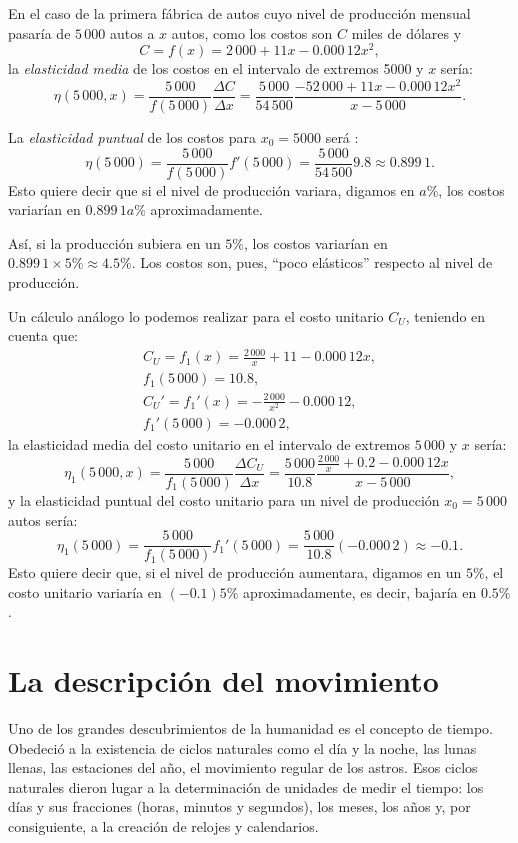 \begin{exemplo}[]{}
En el caso de la primera fábrica de autos cuyo nivel de producción mensual pasaría de $5\,000$
autos a $x$ autos, como los costos son $C$ miles de dólares y
\[
C = f(x)= 2\,000+11x-0.000\,12x^2,
\]
la \emph{elasticidad media} de los costos en el intervalo de extremos 5000 y $x$ sería:
\[
\eta (5\,000,x)= \frac{5\,000}{f(5\,000)}\frac{\Delta C}{\Delta x}=
\frac{5\,000}{54\,500}\frac{-52\,000+11x-0.000\,12x^2}{x-5\,000}.
\]

La \emph{elasticidad puntual} de los costos para $x_0 =5000$ será :
\[
\eta (5\,000)= \frac{5\,000}{f(5\,000)}f'(5\,000)= \frac{5\,000}{54\,500}9.8\approx 0.899\,1.
\]
Esto quiere decir que si el nivel de producción variara, digamos en $a\%$, los costos variarían en
$0.899\,1 a\%$ aproximadamente.

Así, si la producción subiera en un $5\%$, los costos variarían en $0.899\,1\times 5\%\approx
4.5\%$. Los costos son, pues, ``poco elásticos'' respecto al nivel de producción.

Un cálculo análogo lo podemos realizar para el costo unitario $C_U$, teniendo en cuenta que:
\begin{gather*}
C_U = f_1(x)= \frac{2\,000}{x}+11-0.000\,12x,\\
f_1(5\,000)=10.8, \\
C_U'=f_1'(x)=-\frac{2\,000}{x^2}-0.000\,12,\\
f_1'(5\,000)=-0.000\,2,
\end{gather*}
la elasticidad media del costo unitario en el intervalo de extremos $5\,000$ y $x$ sería:
\[
\eta_1 (5\,000,x)= \frac{5\,000}{f_1(5\,000)}\frac{\Delta C_U}{\Delta x}=
\frac{5\,000}{10.8}\frac{\frac{2\,000}{x}+0.2-0.000\,12x}{x-5\,000},
\]
y la elasticidad puntual del costo unitario para un nivel de producción $x_0=5\,000$ autos sería:
\[
\eta_1 (5\,000)= \frac{5\,000}{f_1(5\,000)}f_1'(5\,000) =\frac{5\,000}{10.8}(-0.000\,2)\approx -0.1.
\]
Esto quiere decir que, si el nivel de producción aumentara, digamos en un $5\%$, el costo unitario
variaría en $(-0.1)5\%$ aproximadamente, es decir, bajaría en $0.5\%$.
\end{exemplo}

\section{La descripción del movimiento}

Uno de los grandes descubrimientos de la humanidad es el concepto de tiempo. Obedeció a la
existencia de ciclos naturales como el día y la noche, las lunas llenas, las estaciones del año, el
movimiento regular de los astros. Esos ciclos naturales dieron lugar a la determinación de unidades
de medir el tiempo: los días y sus fracciones (horas, minutos y segundos), los meses, los años y,
por consiguiente, a la creación de relojes y calendarios.

